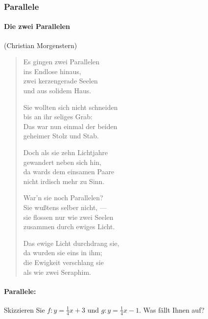 

\subsubsection{Parallele}

\paragraph{Die zwei Parallelen} (Christian Morgenstern)
\begin{verse}
Es gingen zwei Parallelen\\
ins Endlose hinaus,\\
zwei kerzengerade Seelen\\
und aus solidem Haus.

Sie wollten sich nicht schneiden\\
bis an ihr seliges Grab:\\
Das war nun einmal der beiden\\
geheimer Stolz und Stab.

Doch als sie zehn Lichtjahre\\
gewandert neben sich hin,\\
da wards dem einsamen Paare\\
nicht irdisch mehr zu Sinn.

War'n sie noch Parallelen?\\
Sie wußtens selber nicht, ---\\
sie flossen nur wie zwei Seelen\\
zusammen durch ewiges Licht.

Das ewige Licht durchdrang sie,\\
da wurden sie eins in ihm;\\
die Ewigkeit verschlang sie\\
als wie zwei Seraphim.
\end{verse}
\newpage



\paragraph{Parallele:} Skizzieren Sie $f: y=\frac{1}{4}x +3$ und $g:
y=\frac{1}{4}x -1$. Was fällt Ihnen auf?





